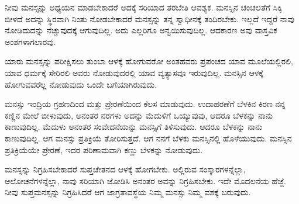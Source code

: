 ನೀವು ಮನಸ್ಸನ್ನು ಅಧ್ಯಯನ ಮಾಡಬೇಕಾದರೆ ಅದಕ್ಕೆ ಸರಿಯಾದ ತರಬೇತಿ ಆವಶ್ಯಕ. ಮನಸ್ಸಿನ ಚಂಚಲತೆಗೆ ಸಿಕ್ಕಿ ಬೀಳದೆ ಅದನ್ನು ಸ್ಥಿರವಾಗಿ ನಿಂತು ನೋಡಬೇಕಾದರೆ ಮನಸ್ಸನ್ನು ತನ್ನ ಸ್ವಾಧೀನಕ್ಕೆ ತಂದಿರಬೇಕು. ಇಲ್ಲದೆ ಇದ್ದರೆ ನಾವು ನೋಡಿದುದನ್ನು ನೆಚ್ಚುವುದಕ್ಕೆ ಆಗುವುದಿಲ್ಲ. ಅದು ಎಲ್ಲರಿಗೂ ಅನ್ವಯಿಸುವುದಿಲ್ಲ. ಆದಕಾರಣ ಅವು ವಾಸ್ತವಿಕ ಅಂಶಗಳಾಗಲಾರವು.

ಯಾರು ಮನಸ್ಸನ್ನು ಪರೀಕ್ಷಿಸಲು ತುಂಬಾ ಆಳಕ್ಕೆ ಹೋಗುವರೋ ಅಂತಹವರು ಪ್ರಪಂಚದ ಯಾವ ಮೂಲೆಯಲ್ಲಿರಲಿ, ಯಾವ ಧರ್ಮಕ್ಕೆ ಸೇರಿರಲಿ ಅವರು ನೋಡುವುದರಲ್ಲಿ ಯಾವ ವ್ಯತ್ಯಾಸವೂ ಇರುವುದಿಲ್ಲ. ಮನಸ್ಸಿನ ಆಳಕ್ಕೆ ಹೋಗುವವರೆಲ್ಲ ನೋಡುವುದು ಒಂದೇ ಬಗೆಯಾಗಿರುವುದು.

ಮನಸ್ಸು ಇಂದ್ರಿಯ ಗ್ರಹಣದಿಂದ ಮತ್ತು ಪ್ರೇರಣೆಯಿಂದ ಕೆಲಸ ಮಾಡುವುದು. ಉದಾಹರಣೆಗೆ ಬೆಳಕಿನ ಕಿರಣ ನನ್ನ ಕಣ್ಣಿನ ಮೇಲೆ ಬೀಳುವುದು, ಅನಂತರ ನರಗಳು ಅದನ್ನು ಮೆದುಳಿಗೆ ಒಯ್ಯುವುವು, ಆದರೂ ಬೆಳಕನ್ನು ನಾನು ಕಾಣುವುದಿಲ್ಲ. ಮೆದುಳು ಅನಂತರ ಸಂವೇದನೆಯನ್ನು ಮನಸ್ಸಿಗೆ ತಿಳಿಸುವುದು. ಆದರೂ ಬೆಳಕನ್ನು ನಾನು ಕಾಣುವುದಿಲ್ಲ. ಆಗ ಮನಸ್ಸು ಪ್ರತಿಕ್ರಿಯೆ ತೋರಿಸುತ್ತದೆ. ಆಗ ನನಗೆ ಬೆಳಕು ಮನಸ್ಸಿನಲ್ಲಿ ಹೊಳೆಯುವುದು. ಮನಸ್ಸಿನ ಪ್ರತಿಕ್ರಿಯೆಯೇ ಪ್ರೇರಣೆ, ಇದರ ಪರಿಣಾಮವಾಗಿ ಕಣ್ಣು ಬೆಳಕನ್ನು ನೋಡುವುದು.

ಮನಸ್ಸನ್ನು ನಿಗ್ರಹಿಸಬೇಕಾದರೆ ಸುಪ್ತಚೇತನದ ಆಳಕ್ಕೆ ಹೋಗಬೇಕು. ಅಲ್ಲಿರುವ ಸಂಸ್ಕಾರಗಳನ್ನೆಲ್ಲಾ, ಆಲೋಚನೆಗಳನ್ನೆಲ್ಲಾ, ನಾವು ಸರಿಯಾಗಿ ಜೋಡಿಸಿ ಅನಂತರ ಅವನ್ನು ನಿಗ್ರಹಿಸಬೇಕು. ಇದೇ ಮೊದಲನೆಯ ಹೆಜ್ಜೆ. ನೀವು ಸುಪ್ತಮನಸ್ಸನ್ನು ನಿಗ್ರಹಿಸಿದರೆ ಆಗ ಜಾಗ್ರತಾವಸ್ಥೆಯ ನಿಮ್ಮ ಮನಸ್ಸು ನಿಮ್ಮ ವಶಕ್ಕೆ ಬರುವುದು.

